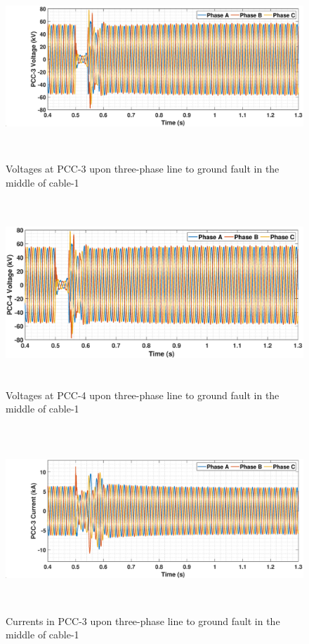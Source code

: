 \begin{figure}[H]
    \includegraphics[height = 7cm,width = \textwidth]{Diagrams/Appendix_C/VABC_WT3_3phaseSC.eps}
    \caption{Voltages at PCC-3 upon three-phase line to ground fault in the middle of cable-1}
    \label{VABC_WT3_3phaseSC}
\end{figure}

\begin{figure}[H]
    \includegraphics[height = 7cm,width = \textwidth]{Diagrams/Appendix_C/VABC_WT4_3phaseSC.eps}
    \caption{Voltages at PCC-4 upon three-phase line to ground fault in the middle of cable-1}
    \label{VABC_WT4_3phaseSC}
\end{figure}

\begin{figure}[H]
    \includegraphics[height = 7cm,width = \textwidth]{Diagrams/Appendix_C/IABC_WT3_3phaseSC.eps}
    \caption{Currents in PCC-3 upon three-phase line to ground fault in the middle of cable-1}
    \label{IABC_WT3_3phaseSC}
\end{figure}

